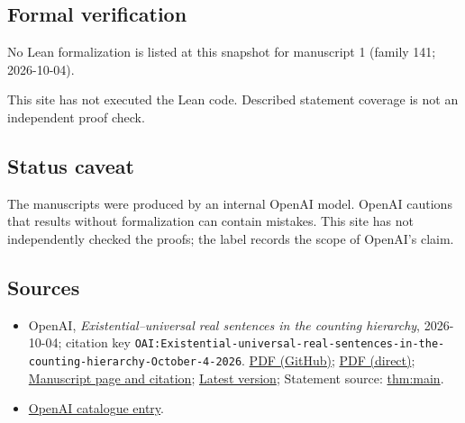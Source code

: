 \documentclass[11pt]{article}
\begin{document}
\subsection{Formal verification}
No Lean formalization is listed at this snapshot for manuscript 1 (family 141; 2026-10-04).

This site has not executed the Lean code. Described statement coverage is not an independent proof check.

\subsection{Status caveat}
The manuscripts were produced by an internal OpenAI model. OpenAI cautions that results without formalization can contain mistakes. This site has not independently checked the proofs; the label records the scope of OpenAI's claim.

\subsection{Sources}
\begin{itemize}
\item OpenAI, \emph{Existential–universal real sentences in the counting hierarchy}, 2026-10-04; citation key \texttt{OAI:Existential-universal-real-sentences-in-the-counting-hierarchy-October-4-2026}. \href{https://github.com/openai/math/blob/adc7f1241b42e322a6451854ab7e4b4c146bf78a/preprints/Existential-universal-real-sentences-in-the-counting-hierarchy-October-4-2026/etr-counting-hierarchy.pdf}{PDF (GitHub)}; \href{https://github.com/openai/math/raw/adc7f1241b42e322a6451854ab7e4b4c146bf78a/preprints/Existential-universal-real-sentences-in-the-counting-hierarchy-October-4-2026/etr-counting-hierarchy.pdf}{PDF (direct)}; \href{https://github.com/openai/math/blob/adc7f1241b42e322a6451854ab7e4b4c146bf78a/preprints/Existential-universal-real-sentences-in-the-counting-hierarchy-October-4-2026/README.md}{Manuscript page and citation}; \href{https://github.com/openai/math/blob/main/preprints/Existential-universal-real-sentences-in-the-counting-hierarchy-October-4-2026/etr-counting-hierarchy.pdf}{Latest version}; Statement source: \href{https://github.com/openai/math/blob/adc7f1241b42e322a6451854ab7e4b4c146bf78a/preprints/Existential-universal-real-sentences-in-the-counting-hierarchy-October-4-2026/build/sections/01-introduction.tex\#L30}{thm:main}.
\item \href{https://github.com/openai/math/blob/adc7f1241b42e322a6451854ab7e4b4c146bf78a/CONTENTS.md}{OpenAI catalogue entry}.
\end{itemize}
\end{document}
